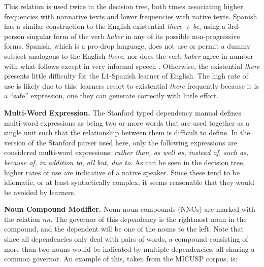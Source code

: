 \documentclass[main.tex]{subfiles}
\begin{document}
This relation is used twice in the decision tree, both times associating higher frequencies with nonnative texts and lower frequencies with native texts. Spanish has a similar construction to the English existential \textit{there + be}, using a 3rd-person singular form of the verb \textit{haber} in any of its possible non-progressive forms. Spanish, which is a pro-drop language, does not use or permit a dummy subject analogous to the English \textit{there}, nor does the verb \textit{haber} agree in number with what follows except in very informal speech \citep[pp. 429-32]{butt}. Otherwise, the existential \textit{there} presents little difficulty for the L1-Spanish learner of English. The high rate of use is likely due to this: learners resort to existential \textit{there} frequently because it is a ``safe'' expression, one they can generate correctly with little effort.


\textbf{Multi-Word Expression.} The Stanford typed dependency manual \citep{typed-deps-manual} defines multi-word expressions as being two or more words that are used together as a single unit such that the relationship between them is difficult to define. In the version of the Stanford parser used here, only the following expressions are considered multi-word expressions: \textit{rather than, as well as, instead of, such as, because of, in addition to, all but, due to}. As can be seen in the decision tree, higher rates of use are indicative of a native speaker. Since these tend to be idiomatic, or at least syntactically complex, it seems reasonable that they would be avoided by learners.


\textbf{Noun Compound Modifier.} Noun-noun compounds (NNCs) are marked with the relation \textit{nn}. The governor of this dependency is the rightmost noun in the compound, and the dependent will be one of the nouns to the left. Note that since all dependencies only deal with pairs of words, a compound consisting of more than two nouns would be indicated by multiple dependencies, all sharing a common governor. An example of this, taken from the MICUSP corpus, is:
\end{document}
